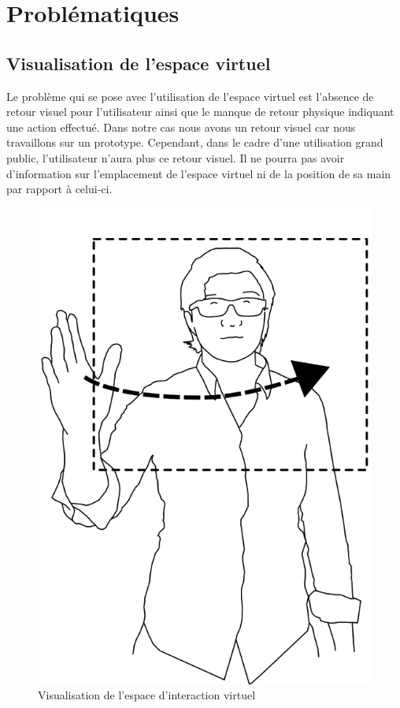 \section{Problématiques}

\subsection{Visualisation de l’espace virtuel}

Le problème qui se pose avec l’utilisation de l’espace virtuel est l’absence de retour visuel pour l’utilisateur ainsi que le manque de retour physique indiquant une action effectué. Dans notre cas nous avons un retour visuel car nous travaillons sur un prototype. Cependant, dans le cadre d’une utilisation grand public, l’utilisateur n’aura plus ce retour visuel. Il ne pourra pas avoir d’information sur l’emplacement de l’espace virtuel ni de la position de sa main par rapport à celui-ci.

\begin{figure}[!ht]
	\center	
	\includegraphics[scale=0.2]{image/remove.png}
	\caption{Visualisation de l'espace d'interaction virtuel}
\end{figure}

